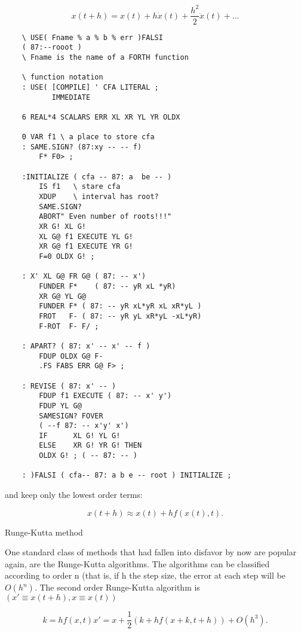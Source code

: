 \begin{equation}
x(t+h) = x(t) + h\dot{x}(t) + \frac{h^2}{2}\ddot{x}(t) + ...
\end{equation}

\begin{lstlisting}
    \ USE( Fname % a % b % err )FALSI
    ( 87:--rooot )
    \ Fname is the name of a FORTH function

    \ function notation
    : USE( [COMPILE] ' CFA LITERAL ;
           IMMEDIATE

    6 REAL*4 SCALARS ERR XL XR YL YR OLDX

    0 VAR f1 \ a place to store cfa
    : SAME.SIGN? (87:xy -- -- f)
        F* F0> ;

    :INITIALIZE ( cfa -- 87: a  be -- )
        IS f1   \ stare cfa
        XDUP    \ interval has root?
        SAME.SIGN?
        ABORT" Even number of roots!!!"
        XR G! XL G!
        XL G@ f1 EXECUTE YL G!
        XR G@ f1 EXECUTE YR G!
        F=0 OLDX G! ;

    : X' XL G@ FR G@ ( 87: -- x')
        FUNDER F*    ( 87: -- yR xL *yR)
        XR G@ YL G@
        FUNDER F* ( 87: -- yR xL*yR xL xR*yL )
        FROT   F- ( 87: -- yR yL xR*yL -xL*yR)
        F-ROT  F- F/ ;

    : APART? ( 87: x' -- x' -- f )
        FDUP OLDX G@ F-
        .FS FABS ERR G@ F> ;

    : REVISE ( 87: x' -- )
        FDUP f1 EXECUTE ( 87: -- x' y')
        FDUP YL G@
        SAMESIGN? FOVER
        ( --f 87: -- x'y' x')
        IF      XL G! YL G!
        ELSE    XR G! YR G! THEN
        OLDX G! ; ( -- 87: -- )

    : )FALSI ( cfa-- 87: a b e -- root ) INITIALIZE ;
\end{lstlisting}

and keep only the lowest order terms:

\begin{equation}
x(t+h) \approx x(t) + hf(x(t), t).
\end{equation}

Runge-Kutta method

One standard class of methods that had fallen into disfavor by now are popular again, are the Runge-Kutta algorithms. The algorithms can be classified according to order n (that is, if h the step size, the error at each step will be $O(h^n)$. The second order Runge-Kutta algorithm is $(x' \equiv x(t+h) , x \equiv x(t) )$

\begin{equation}
k = hf(x,t)
x' = x + \frac{1}{2}(k + hf(x+k, t+h)) + O(h^3).
\end{equation}

